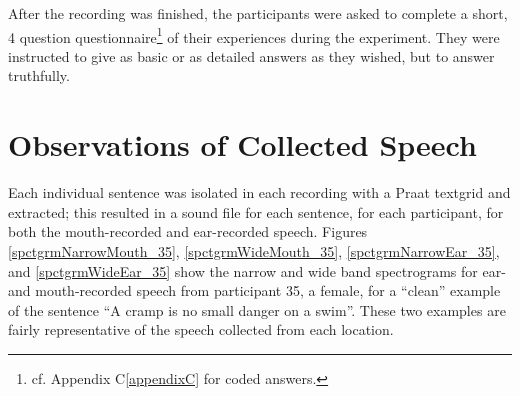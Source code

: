 \documentclass[dissertation,copyright]{uathesis}
\begin{document}
After the recording was finished, the participants were asked to complete a short, 4 question questionnaire\footnote{cf. Appendix C\ref{appendixC} for coded answers.} of their experiences during the experiment.  They were instructed to give as basic or as detailed answers as they wished, but to answer truthfully.  

\section{Observations of Collected Speech}

Each individual sentence was isolated in each recording with a Praat textgrid and extracted; this resulted in a sound file for each sentence, for each participant, for both the mouth-recorded and ear-recorded speech.  Figures \ref{spctgrmNarrowMouth_35}, \ref{spctgrmWideMouth_35}, \ref{spctgrmNarrowEar_35}, and \ref{spctgrmWideEar_35} show the narrow and wide band spectrograms for ear- and mouth-recorded speech from participant 35, a female, for a ``clean'' example of the sentence ``A cramp is no small danger on a swim''.  These two examples are fairly representative of the speech collected from each location.
\end{document}
